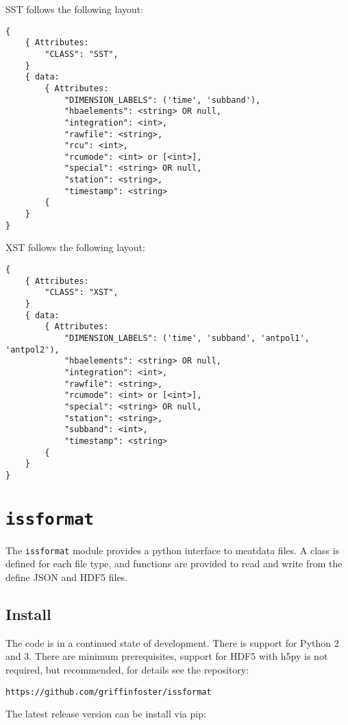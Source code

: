 \documentclass[10pt,a4paper]{article}
\begin{document}
\noindent SST follows the following layout:

\begin{verbatim}
{
    { Attributes:
        "CLASS": "SST",
    }
    { data:
        { Attributes:
            "DIMENSION_LABELS": ('time', 'subband'),
            "hbaelements": <string> OR null,
            "integration": <int>,
            "rawfile": <string>,
            "rcu": <int>,
            "rcumode": <int> or [<int>],
            "special": <string> OR null,
            "station": <string>,
            "timestamp": <string>
        {
    }
}
\end{verbatim}

\noindent XST follows the following layout:

\begin{verbatim}
{
    { Attributes:
        "CLASS": "XST",
    }
    { data:
        { Attributes:
            "DIMENSION_LABELS": ('time', 'subband', 'antpol1', 'antpol2'),
            "hbaelements": <string> OR null,
            "integration": <int>,
            "rawfile": <string>,
            "rcumode": <int> or [<int>],
            "special": <string> OR null,
            "station": <string>,
            "subband": <int>,
            "timestamp": <string>
        {
    }
}
\end{verbatim}

\section{\texttt{issformat}}

The \texttt{issformat} module provides a python interface to meatdata files. A
class is defined for each file type, and functions are provided to read and
write from the define JSON and HDF5 files. 

\subsection{Install}

The code is in a continued state of development. There is support for Python 2
and 3. There are minimum prerequisites, support for HDF5 with h5py is not
required, but recommended, for details see the repository:

\begin{verbatim}
https://github.com/griffinfoster/issformat
\end{verbatim}

\noindent The latest release version can be install via pip:
\end{document}
